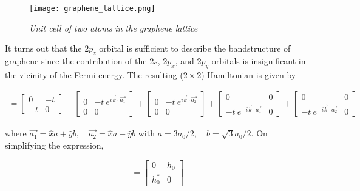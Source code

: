 \vspace{0.6cm}

\begin{figure}[h]
\centering
\texttt{[image: graphene\_lattice.png]}
\caption{\textit{Unit cell of two atoms in the graphene lattice}}
\label{graphene}
\end{figure}

\vspace{0.6cm}

It turns out that the 2$p_{z}$ orbital is sufficient to describe the bandstructure of graphene since the contribution of the 2$s$, 2$p_{x}$, and 2$p_{y}$ orbitals is insignificant in the vicinity of the Fermi energy. The resulting ($2 \times 2$) Hamiltonian is given by 

\begin{align*}
    [h(\vec{k})] = 
    \begin{bmatrix}
        0 & -t \\
        -t & 0 
    \end{bmatrix} + 
    \begin{bmatrix}
        0 & -t\:e^{i\vec{k}\cdot\vec{a_1}} \\ 
        0 & 0
    \end{bmatrix} + 
    \begin{bmatrix}
        0 & -t\:e^{i\vec{k}\cdot\vec{a_2}} \\
        0 & 0
    \end{bmatrix} +  
    \begin{bmatrix}
        0 & 0 \\
        -t\:e^{-i\vec{k}\cdot\vec{a_1}} & 0
    \end{bmatrix} + 
    \begin{bmatrix}
        0 & 0 \\
        -t\:e^{-i\vec{k}\cdot\vec{a_2}} & 0 
    \end{bmatrix}  
\end{align*} 

where $\vec{a_1} = \hat{x}a+\hat{y}b, \quad \vec{a_2} = \hat{x}a-\hat{y}b$ with $a = 3a_{0}/2, \quad b = \sqrt{3}a_{0}/2 $. On simplifying the expression, 

\begin{equation}
[h(\vec{k})] =
    \begin{bmatrix}
        0 & h_{0} \\
        h_{0}^{*} & 0 
    \end{bmatrix}
\end{equation}

